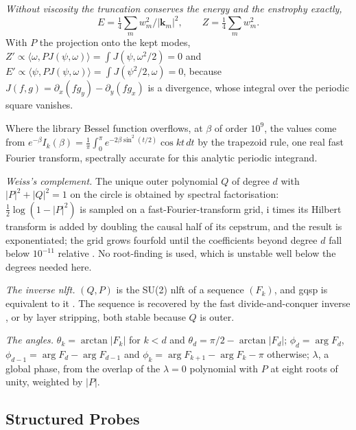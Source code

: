 \emph{Without viscosity the truncation conserves the energy and the enstrophy exactly,}
\begin{equation}
    E=\tfrac14\textstyle\sum_mw_m^2/|\mathbf k_m|^2,
    \qquad
    Z=\tfrac14\textstyle\sum_mw_m^2 .
\end{equation}
With $P$ the projection onto the kept modes, $Z'\propto\langle\omega,PJ(\psi,\omega)\rangle=\int J(\psi,\omega^2/2)=0$ and $E'\propto\langle\psi,PJ(\psi,\omega)\rangle=\int J(\psi^2/2,\omega)=0$, because $J(f,g)=\partial_x(fg_y)-\partial_y(fg_x)$ is a divergence, whose integral over the periodic square vanishes.

Where the library Bessel function overflows, at $\beta$ of order $10^9$, the values come from $e^{-\beta}I_k(\beta)=\frac1\pi\int_0^\pi e^{-2\beta\sin^2(t/2)}\cos kt\,dt$ by the trapezoid rule, one real fast Fourier transform, spectrally accurate for this analytic periodic integrand.

    \item \emph{Weiss's complement.} The unique outer polynomial $Q$ of degree $d$ with $|P|^2+|Q|^2=1$ on the circle is obtained by spectral factorisation: $\tfrac12\log(1-|P|^2)$ is sampled on a fast-Fourier-transform grid, $\mathrm{i}$ times its Hilbert transform is added by doubling the causal half of its cepstrum, and the result is exponentiated; the grid grows fourfold until the coefficients beyond degree $d$ fall below $10^{-11}$ relative \cite{berntson2025complementary}. No root-finding is used, which is unstable well below the degrees needed here.
    \item \emph{The inverse \gls{nlft}.} $(Q,P)$ is the SU(2) \gls{nlft} of a sequence $(F_k)$, and \gls{gqsp} is equivalent to it \cite{laneve2025gqspnlft}. The sequence is recovered by the fast divide-and-conquer inverse \cite{nlfft2025su2}, or by layer stripping, both stable because $Q$ is outer.
    \item \emph{The angles.} $\theta_k=\arctan|F_k|$ for $k<d$ and $\theta_d=\pi/2-\arctan|F_d|$; $\phi_d=\arg F_d$, $\phi_{d-1}=\arg F_d-\arg F_{d-1}$ and $\phi_k=\arg F_{k+1}-\arg F_k-\pi$ otherwise; $\lambda$, a global phase, from the overlap of the $\lambda=0$ polynomial with $P$ at eight roots of unity, weighted by $|P|$.

\subsection{Structured Probes}
\label{app:structured-probes}

